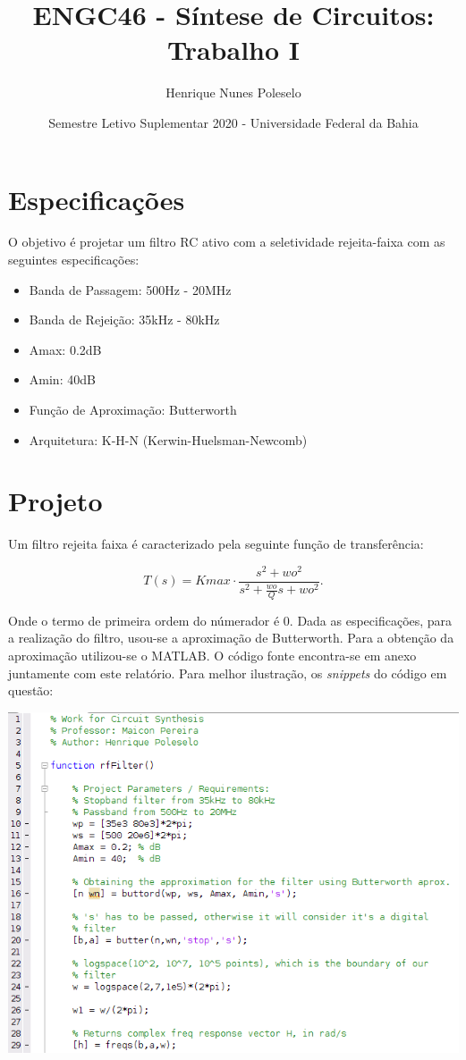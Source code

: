 \documentclass{article}
\title{ENGC46 - Síntese de Circuitos: Trabalho I}
\date{Semestre Letivo Suplementar 2020 - Universidade Federal da Bahia}
\author{Henrique Nunes Poleselo}
\begin{document}
\maketitle

\section{Especificações}
O objetivo é projetar um filtro RC ativo com a seletividade rejeita-faixa com as seguintes especificações:
\begin{itemize} 
    \item Banda de Passagem: 500Hz - 20MHz
    \item Banda de Rejeição: 35kHz - 80kHz
    \item Amax: 0.2dB
    \item Amin: 40dB
    \item Função de Aproximação: Butterworth
    \item Arquitetura: K-H-N (Kerwin-Huelsman-Newcomb)
\end{itemize}


\section{Projeto}

Um filtro rejeita faixa é caracterizado pela seguinte função de transferência:

\begin{equation}
    T(s) = Kmax \cdot \frac{ s^2 + wo^2 }{s^2 + \frac{wo}{Q} s + wo^2}.
\end{equation}

Onde o termo de primeira ordem do númerador é 0. Dada as especificações, para a realização do filtro, usou-se a aproximação de Butterworth. Para a obtenção da aproximação utilizou-se o MATLAB. O código fonte encontra-se em anexo juntamente com este relatório. Para melhor ilustração, os \textit{snippets} do código em questão:

\begin{center}
\centering
  \includegraphics[scale=0.8]{img/code1.png}
\end{center}
\end{document}
